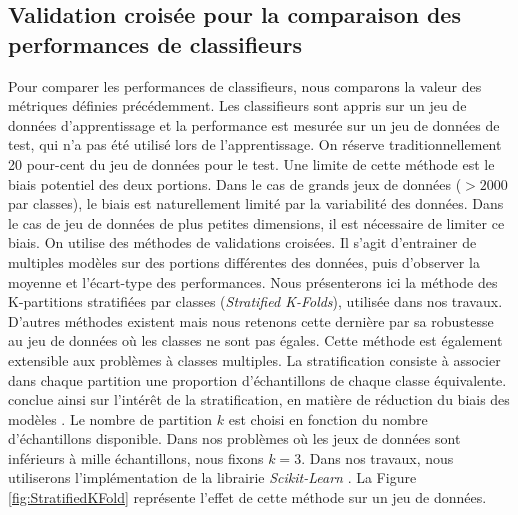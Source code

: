 \subsection{Validation croisée pour la comparaison des performances de classifieurs} \label{subsubsec:cross_val}
Pour comparer les performances de classifieurs, nous comparons la valeur des métriques définies précédemment.
Les classifieurs sont appris sur un jeu de données d'apprentissage et la performance est mesurée sur un jeu de données de test, qui n'a pas été utilisé lors de l'apprentissage.
On réserve traditionnellement 20 pour-cent du jeu de données pour le test.
Une limite de cette méthode est le biais potentiel des deux portions.
Dans le cas de grands jeux de données ($> 2 000$ par classes), le biais est naturellement limité par la variabilité des données.
Dans le cas de jeu de données de plus petites dimensions, il est nécessaire de limiter ce biais.
On utilise des méthodes de validations croisées.
Il s'agit d'entrainer de multiples modèles sur des portions différentes des données, puis d'observer la moyenne et l'écart-type des performances.
Nous présenterons ici la méthode des K-partitions stratifiées par classes (\textit{Stratified K-Folds}), utilisée dans nos travaux.
D'autres méthodes existent mais nous retenons cette dernière par sa robustesse au jeu de données où les classes ne sont pas égales.
Cette méthode est également extensible aux problèmes à classes multiples.
La stratification consiste à associer dans chaque partition une proportion d'échantillons de chaque classe équivalente.
\citeauthor{kohavi_study_1995} conclue ainsi sur l'intérêt de la stratification, en matière de réduction du biais des modèles \cite{kohavi_study_1995}.
Le nombre de partition $k$ est choisi en fonction du nombre d'échantillons disponible.
Dans nos problèmes où les jeux de données sont inférieurs à mille échantillons, nous fixons $k=3$.
Dans nos travaux, nous utiliserons l'implémentation de la librairie \textit{Scikit-Learn} \cite{pedregosa_scikit-learn_2011}.
La Figure \ref{fig:StratifiedKFold} représente l'effet de cette méthode sur un jeu de données.

